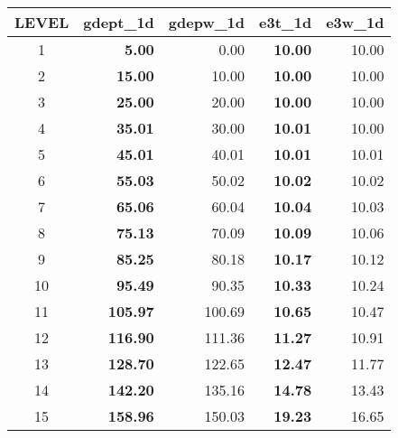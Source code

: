\documentclass[../main/NEMO_manual]{subfiles}
\begin{document}
\begin{table}
  \centering
  \begin{tabular}{c||r|r|r|r}
    \hline
    \textbf{LEVEL} & \textbf{gdept\_1d} & \textbf{gdepw\_1d} & \textbf{e3t\_1d } & \textbf{e3w\_1d} \\
    \hline
    1              & \textbf{     5.00} &               0.00 & \textbf{   10.00} &            10.00 \\
    \hline
    2              & \textbf{    15.00} &              10.00 & \textbf{   10.00} &            10.00 \\
    \hline
    3              & \textbf{    25.00} &              20.00 & \textbf{   10.00} &            10.00 \\
    \hline
    4              & \textbf{    35.01} &              30.00 & \textbf{   10.01} &            10.00 \\
    \hline
    5              & \textbf{    45.01} &              40.01 & \textbf{   10.01} &            10.01 \\
    \hline
    6              & \textbf{    55.03} &              50.02 & \textbf{   10.02} &            10.02 \\
    \hline
    7              & \textbf{    65.06} &              60.04 & \textbf{   10.04} &            10.03 \\
    \hline
    8              & \textbf{    75.13} &              70.09 & \textbf{   10.09} &            10.06 \\
    \hline
    9              & \textbf{    85.25} &              80.18 & \textbf{   10.17} &            10.12 \\
    \hline
    10             & \textbf{    95.49} &              90.35 & \textbf{   10.33} &            10.24 \\
    \hline
    11             & \textbf{   105.97} &             100.69 & \textbf{   10.65} &            10.47 \\
    \hline
    12             & \textbf{   116.90} &             111.36 & \textbf{   11.27} &            10.91 \\
    \hline
    13             & \textbf{   128.70} &             122.65 & \textbf{   12.47} &            11.77 \\
    \hline
    14             & \textbf{   142.20} &             135.16 & \textbf{   14.78} &            13.43 \\
    \hline
    15             & \textbf{   158.96} &             150.03 & \textbf{   19.23} &            16.65 \\

\end{tabular}
\end{table}
\end{document}
